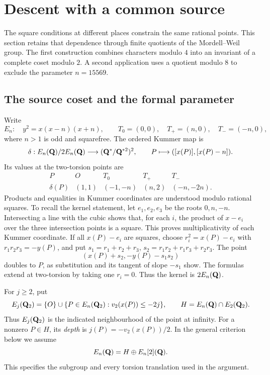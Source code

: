 \section{Descent with a common source}
\label{sec:common-source-descent}

The square conditions at different places constrain the same rational
points.  This section retains that dependence through finite quotients of
the Mordell--Weil group.  The first construction combines characters modulo
$4$ into an invariant of a complete coset modulo $2$.  A second application
uses a quotient modulo $8$ to exclude the parameter $n=15569$.

\subsection{The source coset and the formal parameter}

Write
\[
 E_n:\quad y^2=x(x-n)(x+n),\qquad
 T_0=(0,0),\quad T_+=(n,0),\quad T_-=(-n,0),
\]
where $n>1$ is odd and squarefree.  The ordered Kummer map is
\[
 \delta:E_n(\mathbf Q)/2E_n(\mathbf Q)\longrightarrow
 (\mathbf Q^*/\mathbf Q^{*2})^2,\qquad P\longmapsto([x(P)],[x(P)-n]).
\]
Its values at the two-torsion points are
\begin{equation}\label{eq:cs-torsion-rows}
\begin{array}{c|rrrr}
P&O&T_0&T_+&T_-\\ \hline
\delta(P)&(1,1)&(-1,-n)&(n,2)&(-n,-2n).
\end{array}
\end{equation}
Products and equalities in Kummer coordinates are understood modulo
rational squares.  To recall the kernel statement, let $e_1,e_2,e_3$
be the roots $0,n,-n$.  Intersecting a line with the cubic shows that,
for each $i$, the product of $x-e_i$ over the three intersection points
is a square.  This proves multiplicativity of each Kummer coordinate.
If all $x(P)-e_i$ are squares, choose $r_i^2=x(P)-e_i$ with
$r_1r_2r_3=-y(P)$, and put $s_1=r_1+r_2+r_3$,
$s_2=r_1r_2+r_1r_3+r_2r_3$.  The point
\[
 (x(P)+s_2,-y(P)-s_1s_2)
\]
doubles to $P$, as substitution and its tangent of slope $-s_1$ show.
The formulas extend at two-torsion by taking one $r_i=0$.
Thus the kernel is $2E_n(\mathbf Q)$.

For $j\geq2$, put
\[
 E_j(\mathbf Q_2)=\{O\}\cup
 \{P\in E_n(\mathbf Q_2):v_2(x(P))\leq-2j\},\qquad
 H=E_n(\mathbf Q)\cap E_2(\mathbf Q_2).
\]
Thus $E_j(\mathbf Q_2)$ is the indicated neighbourhood of the point at infinity.
For a nonzero $P\in H$, its \emph{depth} is
$j(P)=-v_2(x(P))/2$.  In the general criterion below we assume
\begin{equation}\label{eq:cs-splitting}
 E_n(\mathbf Q)=H\oplus E_n[2](\mathbf Q).
\end{equation}
This specifies the subgroup and every torsion translation used in the
argument.

